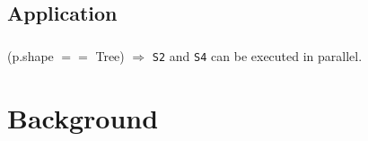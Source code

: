 \documentclass[mathserif,10pt]{beamer}
\begin{document}
\subsection{Application}
\frame
{
	\frametitle{\subsecname}
		
	\begin{figure}
  	\begin{center}
  
  	\end{center}
	\end{figure}

	\begin{center}
	(p.shape $==$ Tree) $\Rightarrow$ {\tt S2} and {\tt S4} can be executed in parallel.
  	\end{center}
}

\section{Background}
\end{document}
